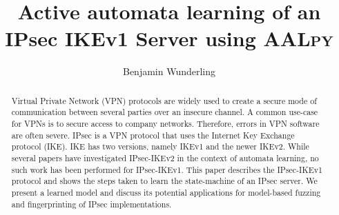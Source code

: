 \documentclass[runningheads]{llncs}
\begin{document}
%
\title{Active automata learning of an IPsec IKEv1 Server using \textsc{AALpy}}
%
%
\author{Benjamin Wunderling}

%
%
%
\maketitle              %
%
\begin{abstract}
Virtual Private Network (VPN) protocols are widely used to create a secure mode of communication between several parties over an insecure channel. A common use-case for VPNs is to secure access to company networks. Therefore, errors in VPN software are often severe. IPsec is a VPN protocol that uses the Internet Key Exchange protocol (IKE). IKE has two versions, namely IKEv1 and the newer IKEv2. While several papers have investigated IPsec-IKEv2 in the context of automata learning, no such work has been performed for IPsec-IKEv1. This paper describes the IPsec-IKEv1 protocol and shows the steps taken to learn the state-machine of an IPsec server. We present a learned model and discuss its potential applications for model-based fuzzing and fingerprinting of IPsec implementations.

\end{abstract}
%
%
%
\end{document}
